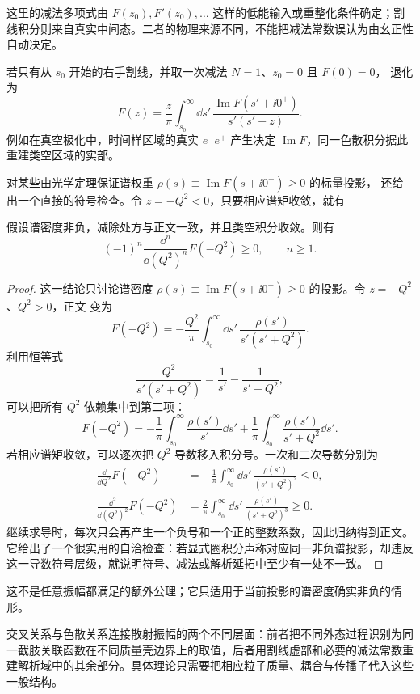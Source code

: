 这里的减法多项式由 $F(z_0),F'(z_0),\ldots$ 这样的低能输入或重整化条件确定；割线积分则来自真实中间态。二者的物理来源不同，不能把减法常数误认为由幺正性自动决定。

若只有从 $s_0$ 开始的右手割线，并取一次减法 $N=1$、$z_0=0$ 且 $F(0)=0$， 退化为
\begin{equation}
 {
 F(z)
 =\frac{z}{\pi}
 \int_{s_0}^{\infty}\dd s'\,
 \frac{\operatorname{Im}F(s'+\ii0^+)}{s'(s'-z)}.}
 \label{eq:once-subtracted-single-cut-dp9}
\end{equation}
例如在真空极化中，时间样区域的真实 $e^-e^+$ 产生决定 $\operatorname{Im}F$，同一色散积分据此重建类空区域的实部。

对某些由光学定理保证谱权重 $\rho(s)\equiv\operatorname{Im}F(s+\ii0^+)\ge0$ 的标量投影， 还给出一个直接的符号检查。令 $z=-Q^2<0$，只要相应谱矩收敛，就有


\begin{proposition}[正谱测度的类空响应符号]
假设谱密度非负，减除处方与正文一致，并且类空积分收敛。则有
\begin{equation}
 {
 (-1)^n\frac{\dd^n}{\dd(Q^2)^n}F(-Q^2)\ge0,
 \qquad n\ge1.}
\label{eq:spacelike-spectral-positivity-dp68}
\end{equation}
\end{proposition}
\begin{proof}
这一结论只讨论谱密度 $\rho(s)\equiv\operatorname{Im}F(s+\ii0^+)\ge0$ 的投影。令 $z=-Q^2$、$Q^2>0$，正文 变为
\begin{equation*}
F(-Q^2)
=-\frac{Q^2}{\pi}
\int_{s_0}^{\infty}\dd s'\,
\frac{\rho(s')}{s'(s'+Q^2)}.
\end{equation*}
利用恒等式
\begin{equation*}
\frac{Q^2}{s'(s'+Q^2)}
=\frac1{s'}-\frac1{s'+Q^2},
\end{equation*}
可以把所有 $Q^2$ 依赖集中到第二项：
\begin{equation*}
F(-Q^2)
=-\frac1\pi\int_{s_0}^{\infty}\frac{\rho(s')}{s'}\dd s'
+\frac1\pi\int_{s_0}^{\infty}\frac{\rho(s')}{s'+Q^2}\dd s'.
\end{equation*}
若相应谱矩收敛，可以逐次把 $Q^2$ 导数移入积分号。一次和二次导数分别为
\begin{align*}
\frac{\dd}{\dd Q^2}F(-Q^2)
&=-\frac1\pi\int_{s_0}^{\infty}\dd s'\,
\frac{\rho(s')}{(s'+Q^2)^2}\le0,\\
\frac{\dd^2}{\dd(Q^2)^2}F(-Q^2)
&=\frac{2}{\pi}\int_{s_0}^{\infty}\dd s'\,
\frac{\rho(s')}{(s'+Q^2)^3}\ge0.
\end{align*}
继续求导时，每次只会再产生一个负号和一个正的整数系数，因此归纳得到正文。它给出了一个很实用的自洽检查：若显式圈积分声称对应同一非负谱投影，却违反这一导数符号层级，就说明符号、减法或解析延拓中至少有一处不一致。
\end{proof}

这不是任意振幅都满足的额外公理；它只适用于当前投影的谱密度确实非负的情形。

交叉关系与色散关系连接散射振幅的两个不同层面：前者把不同外态过程识别为同一截肢关联函数在不同质量壳边界上的取值，后者用割线虚部和必要的减法常数重建解析域中的其余部分。具体理论只需要把相应粒子质量、耦合与传播子代入这些一般结构。


